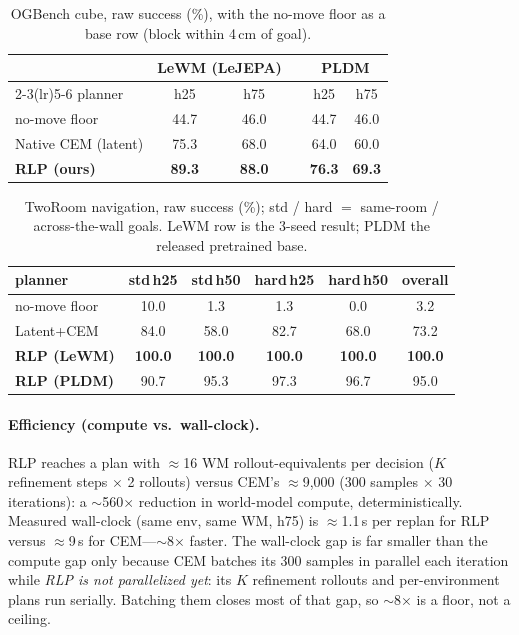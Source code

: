 \documentclass{article}
\begin{document}
\begin{table}[H]
\caption{OGBench cube, raw success (\%), with the no-move floor as a base row
(block within 4\,cm of goal).}
\label{tab:raw}
\centering\small
\begin{tabular}{l cc c cc}
\toprule
& \multicolumn{2}{c}{LeWM (LeJEPA)} & & \multicolumn{2}{c}{PLDM}\\
\cmidrule(lr){2-3}\cmidrule(lr){5-6}
planner & h25 & h75 & & h25 & h75\\
\midrule
no-move floor & 44.7 & 46.0 & & 44.7 & 46.0\\
Native CEM (latent) & 75.3 & 68.0 & & 64.0 & 60.0\\
\textbf{RLP (ours)} & \textbf{89.3} & \textbf{88.0} & & \textbf{76.3} & \textbf{69.3}\\
\bottomrule
\end{tabular}
\end{table}

\begin{table}[H]
\caption{TwoRoom navigation, raw success (\%); std / hard $=$ same-room /
across-the-wall goals. LeWM row is the 3-seed result; PLDM the released
pretrained base.}
\label{tab:tr}
\centering\small
\begin{tabular}{l ccccc}
\toprule
planner & std\,h25 & std\,h50 & hard\,h25 & hard\,h50 & overall\\
\midrule
no-move floor & 10.0 & 1.3 & 1.3 & 0.0 & 3.2\\
Latent+CEM & 84.0 & 58.0 & 82.7 & 68.0 & 73.2\\
\textbf{RLP (LeWM)} & \textbf{100.0} & \textbf{100.0} & \textbf{100.0} & \textbf{100.0} & \textbf{100.0}\\
\textbf{RLP (PLDM)} & 90.7 & 95.3 & 97.3 & 96.7 & 95.0\\
\bottomrule
\end{tabular}
\end{table}

\paragraph{Efficiency (compute vs.\ wall-clock).} RLP reaches a plan with
$\approx$16 WM rollout-equivalents per decision ($K$ refinement steps $\times$ 2
rollouts) versus CEM's $\approx$9{,}000 (300 samples $\times$ 30 iterations): a
$\sim$560$\times$ reduction in world-model compute, deterministically. Measured
wall-clock (same env, same WM, h75) is $\approx$1.1\,s per replan for RLP versus
$\approx$9\,s for CEM---$\sim$8$\times$ faster. The wall-clock gap is far smaller
than the compute gap only because CEM batches its 300 samples in parallel each
iteration while \emph{RLP is not parallelized yet}: its $K$ refinement rollouts
and per-environment plans run serially. Batching them closes most of that gap, so
$\sim$8$\times$ is a floor, not a ceiling.
\end{document}
